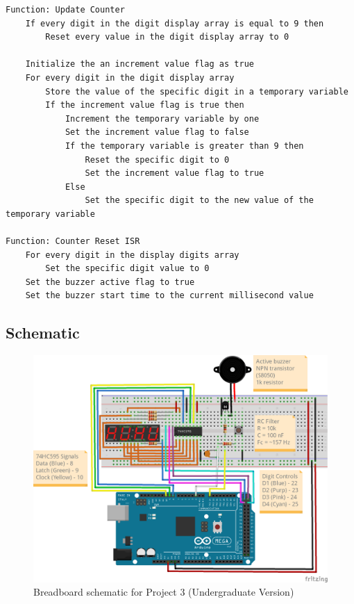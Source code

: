 \begin{lstlisting}[linewidth=1.5\textwidth]
Function: Update Counter
    If every digit in the digit display array is equal to 9 then
        Reset every value in the digit display array to 0
        
    Initialize the an increment value flag as true
    For every digit in the digit display array
        Store the value of the specific digit in a temporary variable
        If the increment value flag is true then
            Increment the temporary variable by one
            Set the increment value flag to false
            If the temporary variable is greater than 9 then
                Reset the specific digit to 0
                Set the increment value flag to true
            Else
                Set the specific digit to the new value of the temporary variable

Function: Counter Reset ISR
    For every digit in the display digits array
        Set the specific digit value to 0
    Set the buzzer active flag to true
    Set the buzzer start time to the current millisecond value
    \end{lstlisting}

    \newpage
    \subsection*{Schematic}
    \begin{figure}[ht!]
        \caption{Breadboard schematic for Project 3 (Undergraduate Version)}
        \includegraphics[]{../.secret/project_3_7seg_counter/p3_7seg_counter_ugrad_bb.png}
    \end{figure}

